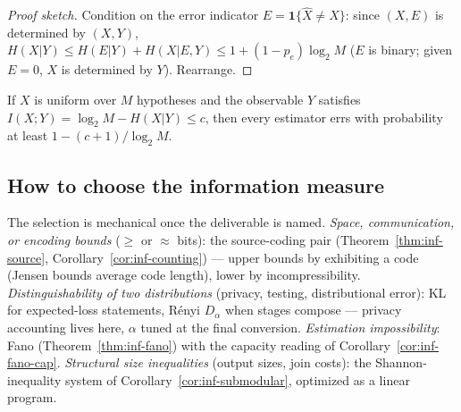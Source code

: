 \begin{proof}[Proof sketch]
Condition on the error indicator $E = \mathbf{1}\{\hat X \ne X\}$: since $(X, E)$ is
determined by $(X, Y)$, $H(X|Y) \le H(E|Y) + H(X|E,Y) \le 1 + (1-p_e)\log_2 M$ ($E$
is binary; given $E = 0$, $X$ is determined by $Y$). Rearrange.
\end{proof}

\begin{corollary}\label{cor:inf-fano-cap}
If $X$ is uniform over $M$ hypotheses and the observable $Y$ satisfies $I(X;Y) =
\log_2 M - H(X|Y) \le c$, then every estimator errs with probability at least
$1 - (c+1)/\log_2 M$. \eop
\end{corollary}

\subsection{How to choose the information measure}
\label{sec:inf-choose}

The selection is mechanical once the deliverable is named. \emph{Space, communication,
or encoding bounds} ($\ge$ or $\approx$ bits): the source-coding pair
(Theorem~\ref{thm:inf-source}, Corollary~\ref{cor:inf-counting}) --- upper bounds by
exhibiting a code (Jensen bounds average code length), lower by incompressibility.
\emph{Distinguishability of two distributions} (privacy, testing, distributional
error): KL for expected-loss statements, R\'enyi $D_\alpha$ when stages compose ---
privacy accounting lives here, $\alpha$ tuned at the final conversion. \emph{Estimation
impossibility}: Fano (Theorem~\ref{thm:inf-fano}) with the capacity reading of
Corollary~\ref{cor:inf-fano-cap}. \emph{Structural size inequalities} (output sizes,
join costs): the Shannon-inequality system of Corollary~\ref{cor:inf-submodular},
optimized as a linear program.

